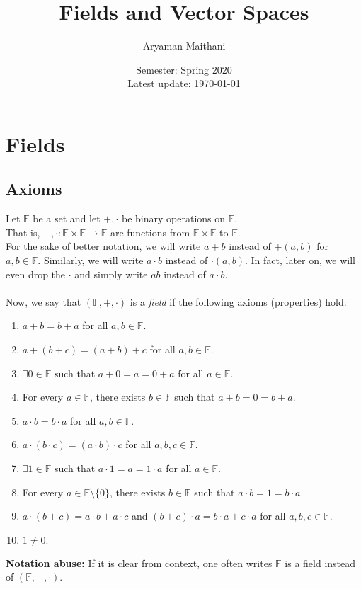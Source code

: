 \documentclass{article}
\title{Fields and Vector Spaces}
\author{Aryaman Maithani}%
\date{Semester: Spring 2020\\ Latest update: \today}
\begin{document}
\maketitle

\section{Fields}
\subsection{Axioms}

Let $\mathbb{F}$ be a set and let $+, \cdot$ be binary operations on $\mathbb{F}.$\\
That is, $+, \cdot:\mathbb{F}\times\mathbb{F}\to\mathbb{F}$ are functions from $\mathbb{F}\times\mathbb{F}$ to $\mathbb{F}$.\\
For the sake of better notation, we will write $a + b$ instead of $+(a, b)$ for $a, b \in \mathbb{F}.$ Similarly, we will write $a\cdot b$ instead of $\cdot(a, b).$ In fact, later on, we will even drop the $\cdot$ and simply write $ab$ instead of $a\cdot b.$\\~\\
Now, we say that $(\mathbb{F}, +, \cdot)$ is a \emph{field} if the following axioms (properties) hold:
\begin{enumerate}[label = (A\arabic*)] 
	\item $a + b = b + a$ for all $a, b \in \mathbb{F}.$
	\item $a + (b + c) = (a + b) + c$ for all $a, b \in \mathbb{F}.$
	\item $\exists 0 \in \mathbb{F}$ such that $a + 0 = a = 0 + a$ for all $a \in \mathbb{F}.$
	\item For every $a \in \mathbb{F}$, there exists $b \in \mathbb{F}$ such that $a + b = 0 = b + a.$
	\item $a \cdot b = b \cdot a$ for all $a, b \in \mathbb{F}.$
	\item $a \cdot (b \cdot c) = (a \cdot b) \cdot c$ for all $a, b, c \in \mathbb{F}.$
	\item $\exists 1 \in \mathbb{F}$ such that $a \cdot 1 = a = 1 \cdot a$ for all $a\in \mathbb{F}.$
	\item For every $a \in \mathbb{F}\setminus\{0\}$, there exists $b \in \mathbb{F}$ such that $a \cdot b = 1 = b \cdot a.$
	\item $a\cdot(b + c) = a\cdot b + a\cdot c$ and $(b + c)\cdot a = b\cdot a + c \cdot a$ for all $a, b, c \in \mathbb{F}.$
	\item $1 \neq 0.$

\end{enumerate}
\textbf{Notation abuse:} If it is clear from context, one often writes $\mathbb{F}$ is a field instead of $(\mathbb{F}, +, \cdot).$
\end{document}
